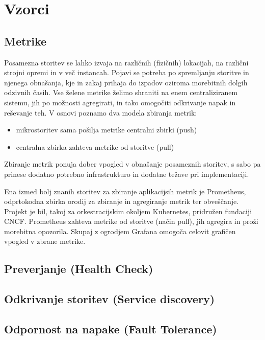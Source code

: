\documentclass[a4paper, 12pt]{book}
\begin{document}
\section{Vzorci}

\subsection{Metrike}

Posamezna storitev se lahko izvaja na različnih (fizičnih) lokacijah, na različni strojni opremi in v več instancah.
Pojavi se potreba po spremljanju storitve in njenega obnašanja, kje in zakaj prihaja do izpadov oziroma morebitnih dolgih odzivnih časih.
Vse želene metrike želimo shraniti na enem centraliziranem sistemu, jih po možnosti agregirati, in tako omogočiti odkrivanje napak in reševanje teh.
V osnovi poznamo dva modela zbiranja metrik: 
\begin{itemize}
	\item mikrostoritev sama pošilja metrike centralni zbirki (push)
	\item centralna zbirka zahteva metrike od storitve (pull)
\end{itemize}

Zbiranje metrik ponuja dober vpogled v obnašanje posameznih storitev, s sabo pa prinese dodatno potrebno infrastrukturo in dodatne težave pri implementaciji.\cite{ApplicationMetrics}


Ena izmed bolj znanih storitev za zbiranje aplikacijsih metrik je Prometheus, odprtokodna zbirka orodij za zbiranje in agregiranje metrik ter obveščanje.
Projekt je bil, takoj za orkestracijskim okoljem Kubernetes, pridružen fundaciji CNCF.
Prometheus zahteva metrike od storitve (način pull), jih agregira in proži morebitna opozorila.
Skupaj z ogrodjem Grafana omogoča celovit grafičen vpogled v zbrane metrike. \cite{Prometheus}


\subsection{Preverjanje (Health Check)}
\subsection{Odkrivanje storitev (Service discovery)}
\subsection{Odpornost na napake (Fault Tolerance)}
\end{document}
